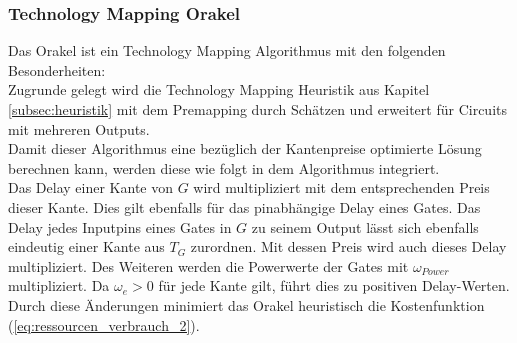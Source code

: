 \documentclass[11pt, a4paper, german]{article}
\newcommand{\TM}{Technology  Mapping }
\begin{document}

\subsubsection{\TM Orakel}
Das Orakel ist ein \TM Algorithmus mit den folgenden Besonderheiten: \\

Zugrunde gelegt wird die \TM Heuristik aus Kapitel \ref{subsec:heuristik} mit dem Premapping durch Schätzen und erweitert für Circuits mit mehreren Outputs. \\
Damit dieser Algorithmus eine bezüglich der Kantenpreise optimierte Lösung berechnen kann, werden diese wie folgt in dem Algorithmus integriert. \\
Das Delay einer Kante von $G$ wird multipliziert mit dem entsprechenden Preis dieser Kante. Dies gilt ebenfalls für das pinabhängige Delay eines Gates. Das Delay jedes Inputpins eines Gates in $G$ zu seinem Output lässt sich ebenfalls eindeutig einer Kante aus $T_G$ zurordnen. Mit dessen Preis wird auch dieses Delay multipliziert. Des Weiteren werden die Powerwerte der Gates mit $\omega_{Power}$ multipliziert. Da $\omega_e >0$ für jede Kante gilt, führt dies zu positiven Delay-Werten. 
Durch diese Änderungen minimiert das Orakel heuristisch die Kostenfunktion (\ref{eq:ressourcen_verbrauch_2}).
\end{document}
